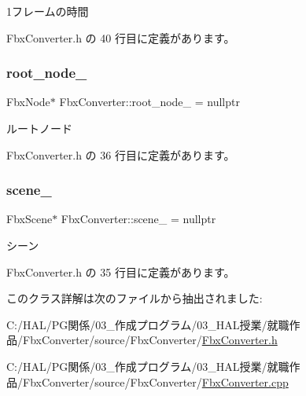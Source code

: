 1フレームの時間 



 Fbx\+Converter.\+h の 40 行目に定義があります。

\mbox{\label{class_fbx_converter_ad5a43f9ee7bcf730c5f95e0ec63a4b8e}} 
\subsubsection{\texorpdfstring{root\+\_\+node\+\_\+}{root\_node\_}}
{\footnotesize\ttfamily Fbx\+Node$\ast$ Fbx\+Converter\+::root\+\_\+node\+\_\+ = nullptr\hspace{0.3cm}{\ttfamily [private]}}



ルートノード 



 Fbx\+Converter.\+h の 36 行目に定義があります。

\mbox{\label{class_fbx_converter_a64600b8f5225b7147c72105558386d78}} 
\subsubsection{\texorpdfstring{scene\+\_\+}{scene\_}}
{\footnotesize\ttfamily Fbx\+Scene$\ast$ Fbx\+Converter\+::scene\+\_\+ = nullptr\hspace{0.3cm}{\ttfamily [private]}}



シーン 



 Fbx\+Converter.\+h の 35 行目に定義があります。



このクラス詳解は次のファイルから抽出されました\+:\begin{DoxyCompactItemize}
\item 
C\+:/\+H\+A\+L/\+P\+G関係/03\+\_\+作成プログラム/03\+\_\+\+H\+A\+L授業/就職作品/\+Fbx\+Converter/source/\+Fbx\+Converter/\mbox{\hyperlink{_fbx_converter_8h}{Fbx\+Converter.\+h}}\item 
C\+:/\+H\+A\+L/\+P\+G関係/03\+\_\+作成プログラム/03\+\_\+\+H\+A\+L授業/就職作品/\+Fbx\+Converter/source/\+Fbx\+Converter/\mbox{\hyperlink{_fbx_converter_8cpp}{Fbx\+Converter.\+cpp}}\end{DoxyCompactItemize}
